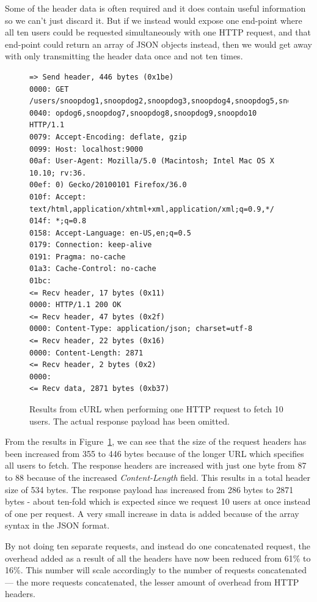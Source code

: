 \documentclass{cslthse-msc}
\begin{document}
Some of the header data is often required and it does contain useful information so we can't just discard it. But if we instead would expose one end-point where all ten users could be requested simultaneously with one HTTP request, and that end-point could return an array of JSON objects instead, then we would get away with only transmitting the header data once and not ten times.

\begin{figure}[H]
  \centering
\begin{lstlisting}[breaklines=true]
=> Send header, 446 bytes (0x1be)
0000: GET /users/snoopdog1,snoopdog2,snoopdog3,snoopdog4,snoopdog5,sno
0040: opdog6,snoopdog7,snoopdog8,snoopdog9,snoopdo10 HTTP/1.1
0079: Accept-Encoding: deflate, gzip
0099: Host: localhost:9000
00af: User-Agent: Mozilla/5.0 (Macintosh; Intel Mac OS X 10.10; rv:36.
00ef: 0) Gecko/20100101 Firefox/36.0
010f: Accept: text/html,application/xhtml+xml,application/xml;q=0.9,*/
014f: *;q=0.8
0158: Accept-Language: en-US,en;q=0.5
0179: Connection: keep-alive
0191: Pragma: no-cache
01a3: Cache-Control: no-cache
01bc:
<= Recv header, 17 bytes (0x11)
0000: HTTP/1.1 200 OK
<= Recv header, 47 bytes (0x2f)
0000: Content-Type: application/json; charset=utf-8
<= Recv header, 22 bytes (0x16)
0000: Content-Length: 2871
<= Recv header, 2 bytes (0x2)
0000:
<= Recv data, 2871 bytes (0xb37)
\end{lstlisting}
  \caption{Results from cURL when performing one HTTP request to fetch 10 users. The actual response payload has been omitted.}
  \label{fig:headers_overhead2}
\end{figure}

From the results in Figure~\ref{fig:headers_overhead2}, we can see that the size of the request headers has been increased from 355 to 446 bytes because of the longer URL which specifies all users to fetch. The response headers are increased with just one byte from 87 to 88 because of the increased \emph{Content-Length} field. This results in a total header size of 534 bytes. The response payload has increased from 286 bytes to 2871 bytes - about ten-fold which is expected since we request 10 users at once instead of one per request. A very small increase in data is added because of the array syntax in the JSON format. 

By not doing ten separate requests, and instead do one concatenated request, the overhead added as a result of all the headers have now been reduced from 61\% to 16\%. This number will scale accordingly to the number of requests concatenated --- the more requests concatenated, the lesser amount of overhead from HTTP headers.
\end{document}
